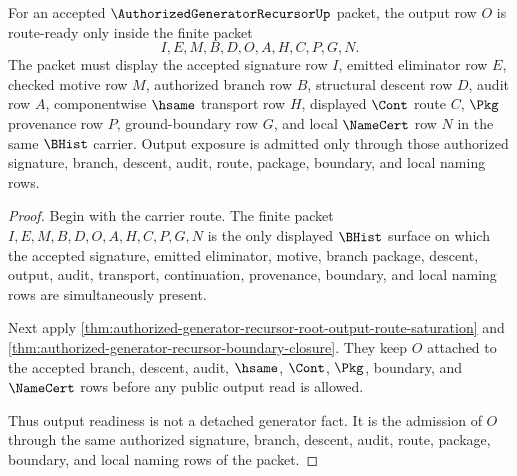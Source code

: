 \begin{theorem}
\label{thm:authorized-generator-recursor-output-route-readiness}
For an accepted $\AuthorizedGeneratorRecursorUp$ packet, the output row $O$ is route-ready only inside the finite packet
$$
I,E,M,B,D,O,A,H,C,P,G,N.
$$
The packet must display the accepted signature row $I$, emitted eliminator row $E$, checked motive row $M$, authorized branch row $B$, structural descent row $D$, audit row $A$, componentwise $\hsame$ transport row $H$, displayed $\Cont$ route $C$, $\Pkg$ provenance row $P$, ground-boundary row $G$, and local $\NameCert$ row $N$ in the same $\BHist$ carrier. Output exposure is admitted only through those authorized signature, branch, descent, audit, route, package, boundary, and local naming rows.
\end{theorem}
\begin{proof}
Begin with the carrier route. The finite packet $I,E,M,B,D,O,A,H,C,P,G,N$ is the only displayed $\BHist$ surface on which the accepted signature, emitted eliminator, motive, branch package, descent, output, audit, transport, continuation, provenance, boundary, and local naming rows are simultaneously present.

Next apply \autoref{thm:authorized-generator-recursor-root-output-route-saturation} and \autoref{thm:authorized-generator-recursor-boundary-closure}. They keep $O$ attached to the accepted branch, descent, audit, $\hsame$, $\Cont$, $\Pkg$, boundary, and $\NameCert$ rows before any public output read is allowed.

Thus output readiness is not a detached generator fact. It is the admission of $O$ through the same authorized signature, branch, descent, audit, route, package, boundary, and local naming rows of the packet.
\end{proof}

